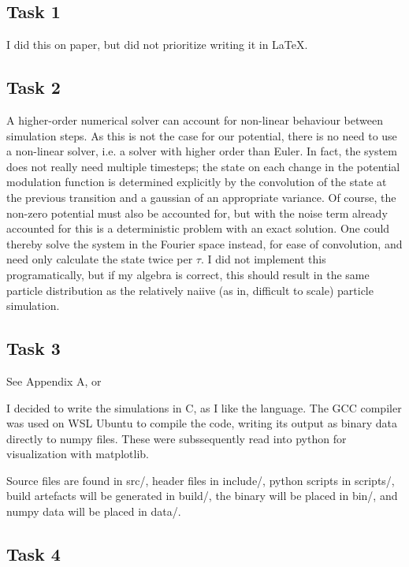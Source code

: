 \subsection*{Task 1}

I did this on paper, but did not prioritize writing it in \LaTeX.

\subsection*{Task 2}

A higher-order numerical solver can account for non-linear behaviour between 
simulation steps. As this is not the case for our potential, there is no need
to use a non-linear solver, i.e. a solver with higher order than Euler. In fact, 
the system does not really need multiple timesteps; the state on each change in 
the potential modulation function is determined explicitly by the convolution 
of the state at the previous transition and a gaussian of an appropriate variance.
Of course, the non-zero potential must also be accounted for, but with the noise
term already accounted for this is a deterministic problem with an exact solution.
One could thereby solve the system in the Fourier space instead, 
for ease of convolution, and need only calculate the state twice per $\tau$.
I did not implement this programatically, but if my algebra is correct,
this should result in the same particle distribution as the relatively naiive 
(as in, difficult to scale) particle simulation.

\subsection*{Task 3}

See Appendix A, or 
\href{
    https://www.github.com/viljarjf/nano/tree/main/TFY4235_numfys/2
    }{\color{blue}{the GitHub source}}

I decided to write the simulations in C, as I like the language. The GCC compiler
was used on WSL Ubuntu to compile the code, writing its output as binary data
directly to numpy files. These were subssequently read into python for 
visualization with matplotlib.

Source files are found in src/, header files in include/, 
python scripts in scripts/, build artefacts will be generated in build/, 
the binary will be placed in bin/, and numpy data will be placed in data/.

\subsection*{Task 4}

